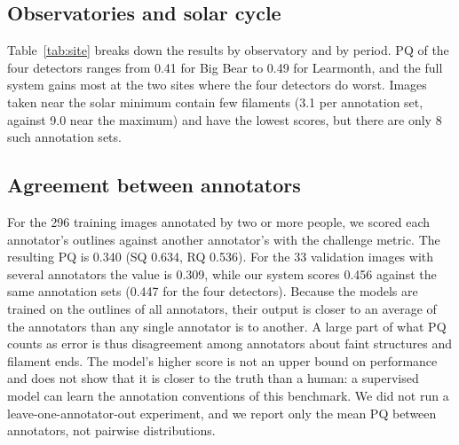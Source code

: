 \documentclass[conference]{IEEEtran}
\begin{document}
\subsection{Observatories and solar cycle}
Table~\ref{tab:site} breaks down the results by observatory and by period. PQ of the four detectors ranges from 0.41 for Big Bear to 0.49 for Learmonth, and the full system gains most at the two sites where the four detectors do worst. Images taken near the solar minimum contain few filaments (3.1 per annotation set, against 9.0 near the maximum) and have the lowest scores, but there are only 8 such annotation sets.

\subsection{Agreement between annotators}
\label{sec:annot}
For the 296 training images annotated by two or more people, we scored each annotator's outlines against another annotator's with the challenge metric. The resulting PQ is 0.340 (SQ 0.634, RQ 0.536). For the 33 validation images with several annotators the value is 0.309, while our system scores 0.456 against the same annotation sets (0.447 for the four detectors). Because the models are trained on the outlines of all annotators, their output is closer to an average of the annotators than any single annotator is to another. A large part of what PQ counts as error is thus disagreement among annotators about faint structures and filament ends. The model's higher score is not an upper bound on performance and does not show that it is closer to the truth than a human: a supervised model can learn the annotation conventions of this benchmark. We did not run a leave-one-annotator-out experiment, and we report only the mean PQ between annotators, not pairwise distributions.
\end{document}
